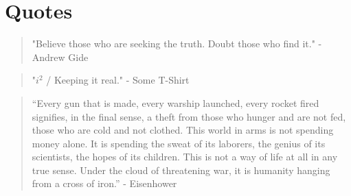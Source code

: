 \documentclass{amsart}
\begin{document}
\section{Quotes}
\begin{quote}
"Believe those who are seeking the truth.  Doubt those who find it."  - Andrew Gide
\end{quote}
\par
\begin{quote}
"$i^2$ / Keeping it real." - Some T-Shirt
\end{quote}
\par
\begin{quote}
``Every gun that is made, every warship launched, every rocket fired signifies, in the final sense, a theft from those who hunger and are not fed, those who are cold and not clothed. This world in arms is not spending money alone. It is spending the sweat of its laborers, the genius of its scientists, the hopes of its children. This is not a way of life at all in any true sense. Under the cloud of threatening war, it is humanity hanging from a cross of iron.'' - Eisenhower
\end{quote}
\end{document}
